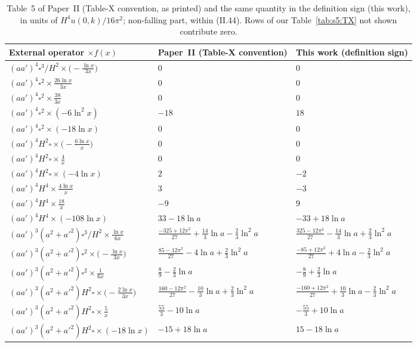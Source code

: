 \documentclass[aps,prd,onecolumn,10pt,nofootinbib,floatfix]{revtex4-2}
\newcommand{\PII}{Paper~II}
\newcommand{\eqII}[1]{(II.#1)}
\begin{document}
\begin{table}[htbp]
\caption{Table~5 of \PII{} (Table-X convention, as printed) and the same quantity in the definition sign (this work),
in units of $H^4u(0,k)/16\pi^2$; non-falling part, within \eqII{44}. Rows of our Table~\ref{tab:s5:TX} not shown
contribute zero.}
\label{tab:s6:tab5}
\renewcommand{\arraystretch}{1.3}
\begin{ruledtabular}
\begin{tabular}{l l l}
External operator $\times f(x)$ & \PII{} (Table-X convention) & This work (definition sign)\\
\hline
$(aa')^4\square^3/H^2\times\big(-\frac{\ln x}{3x}\big)$ & $0$ & $0$\\
$(aa')^4\square^2\times\frac{26\ln x}{3x}$ & $0$ & $0$\\
$(aa')^4\square^2\times\frac{38}{3x}$ & $0$ & $0$\\
$(aa')^4\square^2\times(-6\ln^2x)$ & $-18$ & $18$\\
$(aa')^4\square^2\times(-18\ln x)$ & $0$ & $0$\\
$(aa')^4H^2\square\times\big(-\frac{6\ln x}{x}\big)$ & $0$ & $0$\\
$(aa')^4H^2\square\times\frac4x$ & $0$ & $0$\\
$(aa')^4H^2\square\times(-4\ln x)$ & $2$ & $-2$\\
$(aa')^4H^4\times\frac{4\ln x}{x}$ & $3$ & $-3$\\
$(aa')^4H^4\times\frac{18}x$ & $-9$ & $9$\\
$(aa')^4H^4\times(-108\ln x)$ & $33-18\ln a$ & $-33+18\ln a$\\
$(aa')^3(a^2{+}a'^2)\square^3/H^2\times\frac{\ln x}{6x}$ & $\frac{-325+12\pi^2}{27}+\frac{14}3\ln a-\frac23\ln^2a$ &
$\frac{325-12\pi^2}{27}-\frac{14}3\ln a+\frac23\ln^2a$\\
$(aa')^3(a^2{+}a'^2)\square^2\times\big(-\frac{\ln x}{3x}\big)$ & $\frac{85-12\pi^2}{27}-4\ln a+\frac23\ln^2a$ &
$\frac{-85+12\pi^2}{27}+4\ln a-\frac23\ln^2a$\\
$(aa')^3(a^2{+}a'^2)\square^2\times\frac1{6x}$ & $\frac89-\frac23\ln a$ & $-\frac89+\frac23\ln a$\\
$(aa')^3(a^2{+}a'^2)H^2\square\times\big(-\frac{2\ln x}{3x}\big)$ & $\frac{160-12\pi^2}{27}-\frac{10}3\ln a+\frac23\ln^2a$ &
$\frac{-160+12\pi^2}{27}+\frac{10}3\ln a-\frac23\ln^2a$\\
$(aa')^3(a^2{+}a'^2)H^2\square\times\frac5x$ & $\frac{55}3-10\ln a$ & $-\frac{55}3+10\ln a$\\
$(aa')^3(a^2{+}a'^2)H^2\square\times(-18\ln x)$ & $-15+18\ln a$ & $15-18\ln a$\\

\end{tabular}
\end{ruledtabular}
\end{table}
\end{document}
